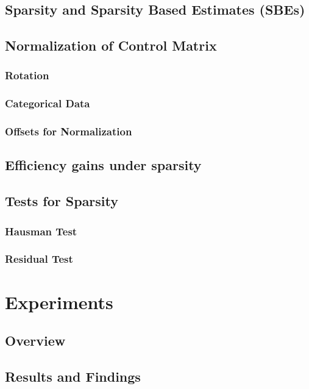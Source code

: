 \subsection{Sparsity and Sparsity Based Estimates (SBEs)}

\subsection{Normalization of Control Matrix}

\subsubsection{Rotation}

\subsubsection{Categorical Data}

\subsubsection{Offsets for Normalization}

\subsection{Efficiency gains under sparsity}


\subsection{Tests for Sparsity}

\subsubsection{Hausman Test}

\subsubsection{Residual Test}


\section{Experiments}

\subsection{Overview}

\subsection{Results and Findings}

